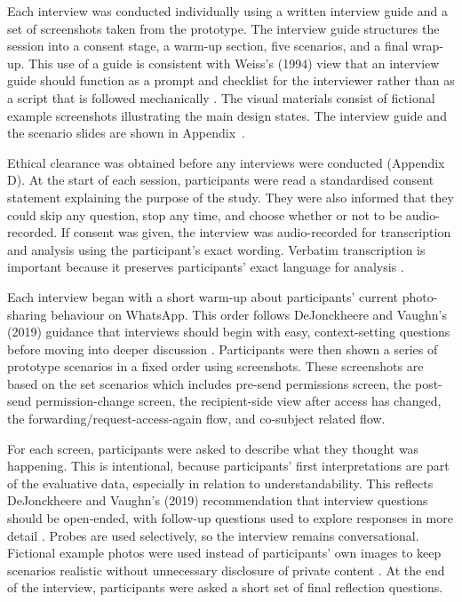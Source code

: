 Each interview was conducted individually using a written interview guide and a set of screenshots taken from the prototype. The interview guide structures the session into a consent stage, a warm-up section, five scenarios, and a final wrap-up. This use of a guide is consistent with Weiss’s (1994) view that an interview guide should function as a prompt and checklist for the interviewer rather than as a script that is followed mechanically \cite{weiss_1994}. The visual materials consist of fictional example screenshots illustrating the main design states. The interview guide and the scenario slides are shown in Appendix~.

Ethical clearance was obtained before any interviews were conducted (Appendix D). At the start of each session, participants were read a standardised consent statement explaining the purpose of the study. They were also informed that they could skip any question, stop any time, and choose whether or not to be audio-recorded. If consent was given, the interview was audio-recorded for transcription and analysis using the participant’s exact wording. Verbatim transcription is important because it preserves participants’ exact language for analysis \cite{dejonckheere_2019}.

Each interview began with a short warm-up about participants’ current photo-sharing behaviour on  WhatsApp. This order follows DeJonckheere and Vaughn’s (2019) guidance that interviews should begin with easy, context-setting questions before moving into deeper discussion \cite{dejonckheere_2019}. Participants were then shown a series of prototype scenarios in a fixed order using screenshots. These screenshots are based on the set scenarios which includes pre-send permissions screen, the post-send permission-change screen, the recipient-side view after access has changed, the forwarding/request-access-again flow, and co-subject related flow. 

For each screen, participants were asked to describe what they thought was happening. This is intentional, because participants’ first interpretations are part of the evaluative data, especially in relation to understandability. This reflects DeJonckheere and Vaughn’s (2019) recommendation that interview questions should be open-ended, with follow-up questions used to explore responses in more detail \cite{dejonckheere_2019}. Probes are used selectively, so the interview remains conversational. Fictional example photos were used instead of participants' own images to keep scenarios realistic without unnecessary disclosure of private content \cite{dejonckheere_2019}. At the end of the interview, participants were asked a short set of final reflection questions.   

